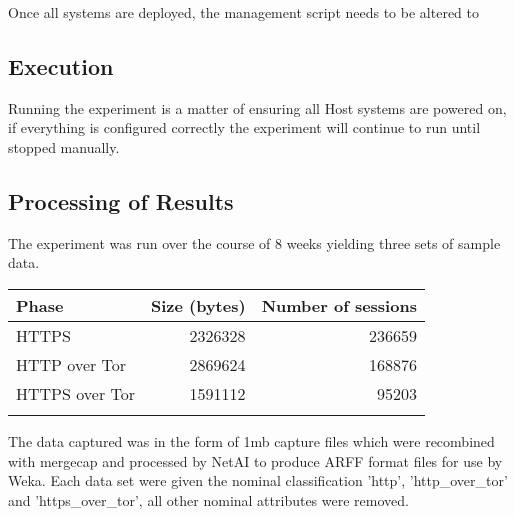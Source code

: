 Once all systems are deployed, the management script needs to be altered to

\subsection{Execution}

Running the experiment is a matter of ensuring all Host systems are powered on,
if everything is configured correctly the experiment will continue to run until
stopped manually.

\subsection{Processing of Results}

The experiment was run over the course of 8 weeks yielding three sets of sample
data.

\begin{tabular}{lrr}
  \toprule
  Phase & Size (bytes) & Number of sessions\\
  \midrule
  HTTPS & 2326328 & 236659\\
  HTTP over Tor & 2869624 & 168876\\
  HTTPS over Tor & 1591112 & 95203\\
  \bottomrule
  \label{table:datasets}
\end{tabular}

The data captured was in the form of 1mb capture files which were recombined
with mergecap and processed by NetAI to produce ARFF format files for use by
Weka. Each data set were given the nominal classification 'http',
'http\_over\_tor' and 'https\_over\_tor', all other nominal attributes were
removed.

